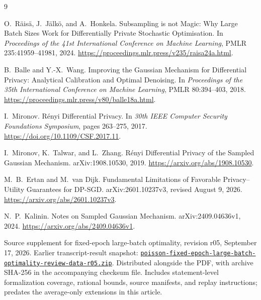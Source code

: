 \documentclass[11pt]{article}
\theoremstyle{remark}
\begin{document}
\begin{thebibliography}{9}

O.~R\"ais\"a, J.~J\"alk\"o, and A.~Honkela.
\newblock Subsampling is not Magic: Why Large Batch Sizes Work for
Differentially Private Stochastic Optimisation.
\newblock In \emph{Proceedings of the 41st International Conference on
Machine Learning}, PMLR 235:41959--41981, 2024.
\newblock \url{https://proceedings.mlr.press/v235/raisa24a.html}.

B.~Balle and Y.-X.~Wang.
\newblock Improving the Gaussian Mechanism for Differential Privacy:
Analytical Calibration and Optimal Denoising.
\newblock In \emph{Proceedings of the 35th International Conference on
Machine Learning}, PMLR 80:394--403, 2018.
\newblock \url{https://proceedings.mlr.press/v80/balle18a.html}.

I.~Mironov.
\newblock R\'enyi Differential Privacy.
\newblock In \emph{30th IEEE Computer Security Foundations Symposium},
pages 263--275, 2017.
\newblock \url{https://doi.org/10.1109/CSF.2017.11}.

I.~Mironov, K.~Talwar, and L.~Zhang.
\newblock R\'enyi Differential Privacy of the Sampled Gaussian Mechanism.
\newblock arXiv:1908.10530, 2019.
\newblock \url{https://arxiv.org/abs/1908.10530}.

M.~B.~Ertan and M.~van Dijk.
\newblock Fundamental Limitations of Favorable Privacy--Utility Guarantees for
DP-SGD.
\newblock arXiv:2601.10237v3, revised August 9, 2026.
\newblock \url{https://arxiv.org/abs/2601.10237v3}.

N.~P.~Kalinin.
\newblock Notes on Sampled Gaussian Mechanism.
\newblock arXiv:2409.04636v1, 2024.
\newblock \url{https://arxiv.org/abs/2409.04636v1}.

{\raggedright
Source supplement for fixed-epoch large-batch optimality, revision r05,
September 17, 2026.
\newblock Earlier transcript-result snapshot:
\href{poisson-fixed-epoch-large-batch-optimality-review-data-r05.zip}{%
\nolinkurl{poisson-fixed-epoch-large-batch-optimality-review-data-r05.zip}}.
\newblock Distributed alongside the PDF, with archive SHA-256 in the
accompanying checksum file.
\newblock Includes statement-level formalization coverage, rational bounds,
source manifests, and replay instructions; predates the average-only
extensions in this article.\par}


\end{thebibliography}
\end{document}
